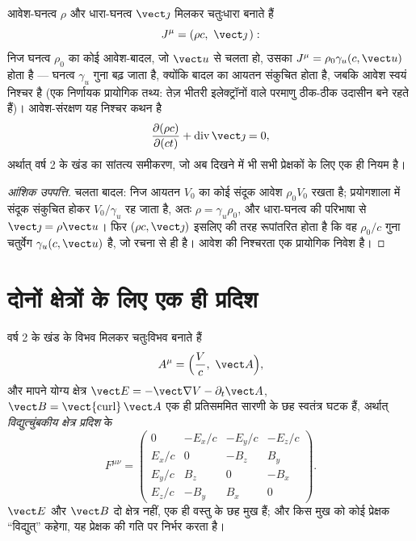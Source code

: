 \begin{proposition}[चतुःधारा और आवेश-संरक्षण]\label{prop:b3:covariant-electromagnetism:fourcurrent}
आवेश-घनत्व $\rho$ और धारा-घनत्व $\vect\jmath$ मिलकर चतुःधारा बनाते
हैं
\[
J^\mu = (\rho c,\ \vect\jmath\,) :
\]
निज घनत्व $\rho_0$ का कोई आवेश-बादल, जो $\vect u$ से चलता हो, उसका
$J^\mu = \rho_0\gamma_u(c, \vect u)$ होता है --- घनत्व $\gamma_u$ गुना
बढ़ जाता है, क्योंकि बादल का आयतन संकुचित होता है, जबकि आवेश स्वयं
निश्चर है (एक निर्णायक प्रायोगिक तथ्य: तेज़ भीतरी इलेक्ट्रॉनों वाले
परमाणु ठीक-ठीक उदासीन बने रहते हैं)। आवेश-संरक्षण यह निश्चर कथन है
\[
\frac{\partial(\rho c)}{\partial(ct)} +
\operatorname{div}\vect\jmath = 0 ,
\]
अर्थात् वर्ष 2 के खंड का सांतत्य समीकरण, जो अब दिखने में भी सभी
प्रेक्षकों के लिए एक ही नियम है।
\end{proposition}

\begin{proof}[आंशिक उपपत्ति]
चलता बादल: निज आयतन $V_0$ का कोई संदूक आवेश $\rho_0
V_0$ रखता है; प्रयोगशाला में संदूक संकुचित होकर $V_0/\gamma_u$ रह जाता
है, अतः $\rho =
\gamma_u\rho_0$, और धारा-घनत्व की परिभाषा से
$\vect\jmath = \rho\vect u$। फिर $(\rho c, \vect\jmath)$ इसलिए
 की तरह रूपांतरित होता है कि वह $\rho_0/c$ गुना
चतुर्वेग $\gamma_u(c, \vect u)$ है, जो रचना से ही  है।
आवेश की निश्चरता एक प्रायोगिक निवेश है।
\end{proof}

\section{दोनों क्षेत्रों के लिए एक ही प्रदिश}

\begin{definition}[चतुःविभव और क्षेत्र प्रदिश]\label{def:b3:covariant-electromagnetism:tensor}
वर्ष 2 के खंड के विभव मिलकर चतुःविभव बनाते हैं
\[
A^\mu = \Big(\frac{V}{c},\ \vect A\Big) ,
\]
और मापने योग्य क्षेत्र $\vect E = -\vect\nabla V -
\partial_t\vect A$, $\vect B = \operatorname{\vect{curl}}\vect A$ एक
ही प्रतिसममित सारणी के छह स्वतंत्र घटक हैं, अर्थात्
\emph{विद्युत्चुंबकीय क्षेत्र प्रदिश} के
\[
F^{\mu\nu} =
\begin{pmatrix}
0 & -E_x/c & -E_y/c & -E_z/c\\
E_x/c & 0 & -B_z & B_y\\
E_y/c & B_z & 0 & -B_x\\
E_z/c & -B_y & B_x & 0
\end{pmatrix} .
\]
$\vect E$ और $\vect B$ दो क्षेत्र नहीं, एक ही वस्तु के छह मुख हैं; और
किस मुख को कोई प्रेक्षक ``विद्युत्'' कहेगा, यह प्रेक्षक की गति पर
निर्भर करता है।
\end{definition}

